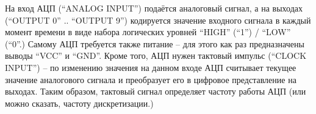 \documentclass[../sparc.tex]{subfiles}
\begin{document}
На вход АЦП (``ANALOG INPUT'') подаётся аналоговый сигнал, а на выходах
(``OUTPUT 0'' .. ``OUTPUT 9'') кодируется значение входного сигнала в каждый
момент времени в виде набора логических уровней ``HIGH'' (``1'') / ``LOW''
(``0''.)  Самому АЦП требуется также питание -- для этого как раз предназначены
выводы ``VCC'' и ``GND''.  Кроме того, АЦП нужен тактовый импульс (``CLOCK
INPUT'') -- по изменению значения на данном входе АЦП считывает текущее значение
аналогового сигнала и преобразует его в цифровое представление на выходах.
Таким образом, тактовый сигнал определяет частоту работы АЦП (или можно сказать,
частоту дискретизации.)

\end{document}
